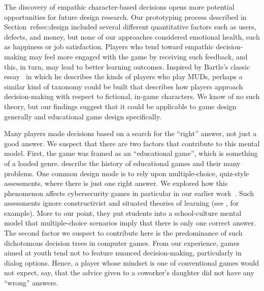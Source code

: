 \documentclass[letterpaper]{article}
\begin{document}
The discovery of empathic character-based decisions opens more
potential opportunities for future design research.
Our prototyping process described in Section~ref{sec:design} included
several different quantitative factors such as users, defects, and money,
but none of our approaches considered emotional health, such as happiness
or job satisfaction. Players who tend toward empathic decision-making
may feel more engaged with the game by receiving such feedback, and this,
in turn, may lead to better learning outcomes.
Inspired by Bartle's classic essay~\citep{Bartle1996} in which he
describes the kinds of players who play MUDs, perhaps a similar
kind of taxonomy could be built that describes how players approach
decision-making with respect to fictional, in-game characters.
We know of no such theory, but our findings suggest that it could be
applicable to game design generally and educational game design
specifically.

Many players made decisions based on a search for the ``right'' answer,
not just a good answer. We suspect that there are two factors
that contribute to this mental model. First, the game was framed as
an ``educational game'', which is something of a loaded genre.
\citet{Klopfer2009} describe the history of educational games and their
many problems. One common design mode is to rely upon multiple-choice,
quiz-style assessments, where there is just one right answer.
We explored how this phenomenon affects cybersecurity games in particular
in our earlier work~\citep{Gestwicki2015}. 
Such assessments ignore constructivist
and situated theories of learning (see \citet{Hickey2003}, for example).
More to our point, they put students into a school-culture mental model
that multiple-choice scenarios imply that there is only one correct
answer.
The second factor we suspect to contribute here is the predominance
of such dichotomous decision trees in computer games. From our experience,
games aimed at youth tend not to feature nuanced decision-making, particularly
in dialog options. Hence, a player whose mindset is one of conventional
games would not expect, say, that the advice given to a coworker's
daughter did not have any ``wrong'' answers.
\end{document}
